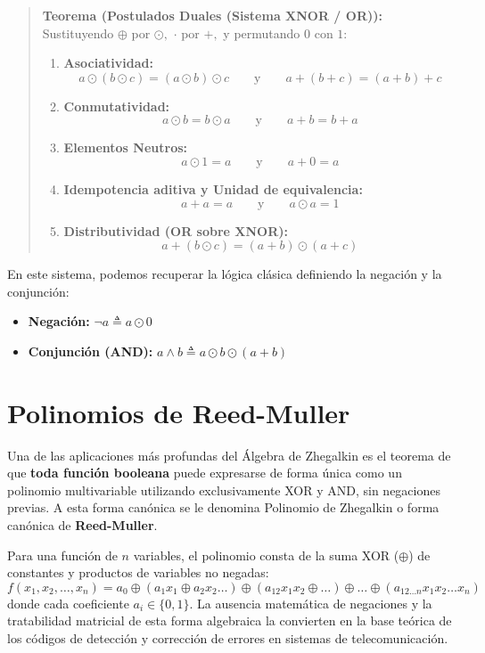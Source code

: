 \begin{quote}\textbf{Teorema (Postulados Duales (Sistema XNOR / OR)):}\label{xnor_or_postulados}
Sustituyendo $\oplus$ por $\odot,$ $\cdot$ por $+,$ y permutando $0$ con $1:$
\begin{enumerate}
    \item \textbf{Asociatividad:} 
    \[ a \odot (b \odot c) = (a \odot b) \odot c \qquad \text{y} \qquad a + (b + c) = (a + b) + c \]
    \item \textbf{Conmutatividad:} 
    \[ a \odot b = b \odot a \qquad \text{y} \qquad a + b = b + a \]
    \item \textbf{Elementos Neutros:} 
    \[ a \odot 1 = a \qquad \text{y} \qquad a + 0 = a \]
    \item \textbf{Idempotencia aditiva y Unidad de equivalencia:} 
    \[ a + a = a \qquad \text{y} \qquad a \odot a = 1 \]
    \item \textbf{Distributividad (OR sobre XNOR):} 
    \[ a + (b \odot c) = (a + b) \odot (a + c) \]
\end{enumerate}
\end{quote}

En este sistema, podemos recuperar la lógica clásica definiendo la negación y la conjunción:
\begin{itemize}
    \item \textbf{Negación:} $\neg a \triangleq a \odot 0$
    \item \textbf{Conjunción (AND):} $a \wedge b \triangleq a \odot b \odot (a + b)$
\end{itemize}

\section{Polinomios de Reed-Muller}

Una de las aplicaciones más profundas del Álgebra de Zhegalkin es el teorema de que \textbf{toda función booleana} puede expresarse de forma única como un polinomio multivariable utilizando exclusivamente XOR y AND, sin negaciones previas. A esta forma canónica se le denomina Polinomio de Zhegalkin o forma canónica de \textbf{Reed-Muller}.

Para una función de $n$ variables, el polinomio consta de la suma XOR ($\oplus$) de constantes y productos de variables no negadas:
\[ f(x_1, x_2, \dots, x_n) = a_0 \oplus (a_1 x_1 \oplus a_2 x_2 \dots) \oplus (a_{12} x_1 x_2 \oplus \dots) \oplus \dots \oplus (a_{12\dots n} x_1 x_2 \dots x_n) \]
donde cada coeficiente $a_i \in \{0, 1\}.$ La ausencia matemática de negaciones y la tratabilidad matricial de esta forma algebraica la convierten en la base teórica de los códigos de detección y corrección de errores en sistemas de telecomunicación.
